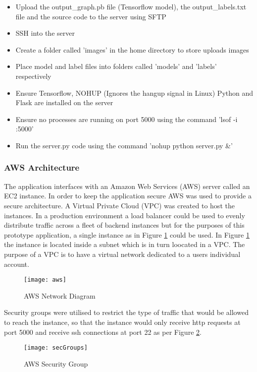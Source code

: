 \begin{itemize}
    \item{Upload the output\_graph.pb file (Tensorflow model), the output\_labels.txt file and the source code to the server using SFTP}
    \item{SSH into the server}
    \item{Create a folder called 'images' in the home directory to store uploads images}
    \item{Place model and label files into folders called 'models' and 'labels' respectively}
    \item{Ensure Tensorflow, NOHUP (Ignores the hangup signal in Linux) Python and Flask are installed on the server}
    \item{Ensure no processes are running on port 5000 using the command 'lsof -i :5000'}
    \item{Run the server.py code using the command 'nohup python server.py \&'}
\end{itemize}

\subsubsection*{AWS Architecture}
The application interfaces with an Amazon Web Services (AWS) server called an EC2 instance.
In order to keep the application secure AWS was used to provide a secure architecture.
A Virtual Private Cloud (VPC) was created to host the instances.
In a production environment a load balancer could be used to evenly distribute traffic across a fleet of backend instances but for the purposes of this prototype application, a single instance as in Figure \ref{fig:aws} could be used.
In Figure \ref{fig:aws} the instance is located inside a subnet which is in turn loocated in a VPC.
The purpose of a VPC is to have a virtual network dedicated to a users individual account. 
\begin{figure}[h]
    \centering
    \texttt{[image: aws]}
    \caption{AWS Network Diagram}
    \label{fig:aws}
\end{figure}

Security groups were utilised to restrict the type of traffic that would be allowed to reach the instance, so that the instance would only receive http requests at port 5000 and receive ssh connections at port 22 as per Figure \ref{fig:awsSecGroup}.
\begin{figure}[h]
    \centering
    \texttt{[image: secGroups]}
    \caption{AWS Security Group}
    \label{fig:awsSecGroup}
\end{figure}

